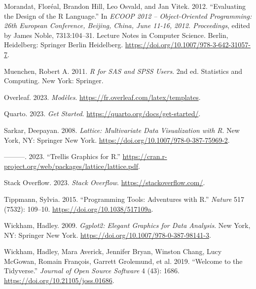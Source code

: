 \documentclass[
  letterpaper,
]{scrbook}
\newlength{\cslhangindent}
\newlength{\cslentryspacingunit} %
\newenvironment{CSLReferences}[2] %
 {%
  \setlength{\parindent}{0pt}
  \ifodd #1
  \let\oldpar\par
  \def\par{\hangindent=\cslhangindent\oldpar}
  \fi
  \setlength{\parskip}{#2\cslentryspacingunit}
 }%
 {}
\begin{document}
\begin{CSLReferences}{1}{0}
\leavevmode{}%
Morandat, Floréal, Brandon Hill, Leo Osvald, and Jan Vitek. 2012.
{``Evaluating the {Design} of the {R Language}.''} In \emph{{ECOOP} 2012
-- {Object-Oriented Programming}: 26th {European Conference}, {Beijing},
{China}, {June} 11-16, 2012. {Proceedings}}, edited by James Noble,
7313:104--31. Lecture {Notes} in {Computer Science}. {Berlin,
Heidelberg}: {Springer Berlin Heidelberg}.
\url{https://doi.org/10.1007/978-3-642-31057-7}.

\leavevmode{}%
Muenchen, Robert A. 2011. \emph{R for {SAS} and {SPSS} Users}. 2nd ed.
Statistics and Computing. {New York}: {Springer}.

\leavevmode{}%
Overleaf. 2023. \emph{Modèles}.
\url{https://fr.overleaf.com/latex/templates}.

\leavevmode{}%
Quarto. 2023. \emph{Get {Started}}.
\url{https://quarto.org/docs/get-started/}.

\leavevmode{}%
Sarkar, Deepayan. 2008. \emph{Lattice: {Multivariate Data Visualization}
with {R}}. {New York, NY}: {Springer New York}.
\url{https://doi.org/10.1007/978-0-387-75969-2}.

\leavevmode{}%
---------. 2023. {``Trellis {Graphics} for {R}.''}
\url{https://cran.r-project.org/web/packages/lattice/lattice.pdf}.

\leavevmode{}%
Stack Overflow. 2023. \emph{Stack {Overflow}}.
\url{https://stackoverflow.com/}.

\leavevmode{}%
Tippmann, Sylvia. 2015. {``Programming Tools: {Adventures} with {R}.''}
\emph{Nature} 517 (7532): 109--10.
\url{https://doi.org/10.1038/517109a}.

\leavevmode{}%
Wickham, Hadley. 2009. \emph{Ggplot2: {Elegant Graphics} for {Data
Analysis}}. {New York, NY}: {Springer New York}.
\url{https://doi.org/10.1007/978-0-387-98141-3}.

\leavevmode{}%
Wickham, Hadley, Mara Averick, Jennifer Bryan, Winston Chang, Lucy
McGowan, Romain François, Garrett Grolemund, et al. 2019. {``Welcome to
the {Tidyverse}.''} \emph{Journal of Open Source Software} 4 (43): 1686.
\url{https://doi.org/10.21105/joss.01686}.


\end{CSLReferences}
\end{document}

